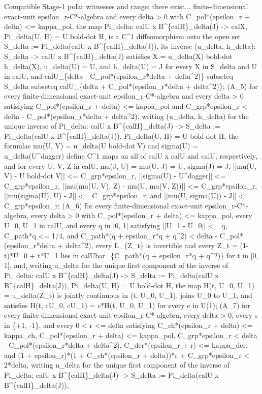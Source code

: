 \documentclass{article}
\begin{document}
\begin{proofbox}{Compatible Stage-1 polar witnesses and range: there exist...}
finite-dimensional exact-unit epsilon\_r-C*-algebra and every delta > 0 with C\_pol*(epsilon\_r + delta) <= kappa\_pol, the map Pi\_delta: calU x B\textasciicircum{}\{calH\}\_delta(J) -> calX, Pi\_delta(U, H) = U bold-dot H, is a C\textasciicircum{}1 diffeomorphism onto the open set S\_delta := Pi\_delta(calU x B\textasciicircum{}\{calH\}\_delta(J)), its inverse (u\_delta, h\_delta): S\_delta -> calU x B\textasciicircum{}\{calH\}\_delta(J) satisfies X = u\_delta(X) bold-dot h\_delta(X), u\_delta(U) = U, and h\_delta(U) = J for every X in S\_delta and U in calU, and calU\_\{delta - C\_pol*(epsilon\_r*delta + delta\textasciicircum{}2)\} subseteq S\_delta subseteq calU\_\{delta + C\_pol*(epsilon\_r*delta + delta\textasciicircum{}2)\}; (A\_5) for every finite-dimensional exact-unit epsilon\_r-C*-algebra and every delta > 0 satisfying C\_pol*(epsilon\_r + delta) <= kappa\_pol and C\_grp*epsilon\_r < delta - C\_pol*(epsilon\_r*delta + delta\textasciicircum{}2), writing (u\_delta, h\_delta) for the unique inverse of Pi\_delta: calU x B\textasciicircum{}\{calH\}\_delta(J) -> S\_delta := Pi\_delta(calU x B\textasciicircum{}\{calH\}\_delta(J)), Pi\_delta(U, H) = U bold-dot H, the formulas mu(U, V) = u\_delta(U bold-dot V) and sigma(U) = u\_delta(U\textasciicircum{}dagger) define C\textasciicircum{}1 maps on all of calU x calU and calU, respectively, and for every U, V, Z in calU, mu(J, U) = mu(U, J) = U, sigma(J) = J, ||mu(U, V) - U bold-dot V|| <= C\_grp*epsilon\_r, ||sigma(U) - U\textasciicircum{}dagger|| <= C\_grp*epsilon\_r, ||mu(mu(U, V), Z) - mu(U, mu(V, Z))|| <= C\_grp*epsilon\_r, ||mu(sigma(U), U) - J|| <= C\_grp*epsilon\_r, and ||mu(U, sigma(U)) - J|| <= C\_grp*epsilon\_r; (A\_6) for every finite-dimensional exact-unit epsilon\_r-C*-algebra, every delta > 0 with C\_pol*(epsilon\_r + delta) <= kappa\_pol, every U\_0, U\_1 in calU, and every q in [0, 1] satisfying ||U\_1 - U\_0|| <= q, C\_path*q <= 1/4, and C\_path*(q + epsilon\_r*q + q\textasciicircum{}2) < delta - C\_pol*(epsilon\_r*delta + delta\textasciicircum{}2), every L\_\{Z\_t\} is invertible and every Z\_t = (1-t)*U\_0 + t*U\_1 lies in calUbar\_\{C\_path*(q + epsilon\_r*q + q\textasciicircum{}2)\} for t in [0, 1], and, writing u\_delta for the unique first component of the inverse of Pi\_delta: calU x B\textasciicircum{}\{calH\}\_delta(J) -> S\_delta := Pi\_delta(calU x B\textasciicircum{}\{calH\}\_delta(J)), Pi\_delta(U, H) = U bold-dot H, the map H(t, U\_0, U\_1) = u\_delta(Z\_t) is jointly continuous in (t, U\_0, U\_1), joins U\_0 to U\_1, and satisfies H(t, cU\_0, cU\_1) = c*H(t, U\_0, U\_1) for every c in U(1); (A\_7) for every finite-dimensional exact-unit epsilon\_r-C*-algebra, every delta > 0, every s in \{+1, -1\}, and every 0 < r <= delta satisfying C\_ch*(epsilon\_r + delta) <= kappa\_ch, C\_pol*(epsilon\_r + delta) <= kappa\_pol, C\_grp*epsilon\_r < delta - C\_pol*(epsilon\_r*delta + delta\textasciicircum{}2), C\_der*(epsilon\_r + r) <= kappa\_der, and (1 + epsilon\_r)*(1 + C\_ch*(epsilon\_r + delta))*r + C\_grp*epsilon\_r < 2*delta, writing u\_delta for the unique first component of the inverse of Pi\_delta: calU x B\textasciicircum{}\{calH\}\_delta(J) -> S\_delta := Pi\_delta(calU x B\textasciicircum{}\{calH\}\_delta(J)), 
\end{proofbox}
\end{document}
